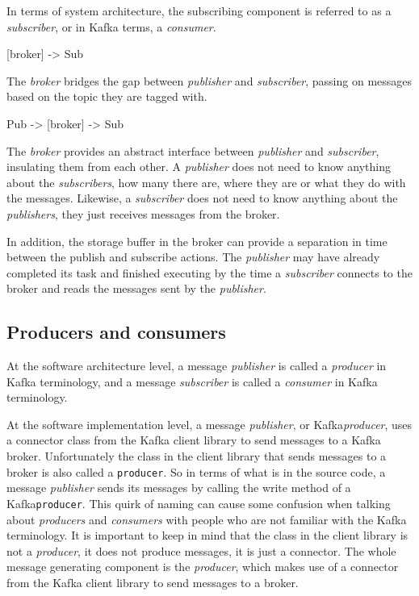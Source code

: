 \documentclass{article}
\newcommand{\kafka} {Kafka\xspace}
\newcommand{\kfbroker} {\textit{broker}\xspace}
\newcommand{\kfconsumer} {\textit{consumer}\xspace}
\newcommand{\kfconsumers} {\textit{consumers}\xspace}
\newcommand{\kfproducer} {\textit{producer}\xspace}
\newcommand{\kfproducers} {\textit{producers}\xspace}
\newcommand{\kfpublisher} {\textit{publisher}\xspace}
\newcommand{\kfpublishers} {\textit{publishers}\xspace}
\newcommand{\kfsubscriber} {\textit{subscriber}\xspace}
\newcommand{\kfsubscribers} {\textit{subscribers}\xspace}
\begin{document}
In terms of system architecture, the subscribing component is referred to as a \kfsubscriber, or in \kafka terms, a \kfconsumer.

   [broker] -> {Sub}

The \kfbroker bridges the gap between \kfpublisher and \kfsubscriber, passing on messages based on the topic they are tagged with.

   {Pub} -> [broker] -> {Sub}

The \kfbroker provides an abstract interface between \kfpublisher and \kfsubscriber, insulating them from each other. A \kfpublisher does not need to know anything about the \kfsubscribers, how many there are, where they are or what they do with the messages. Likewise, a \kfsubscriber does not need to know anything about the \kfpublishers, they just receives messages from the broker. 

In addition, the storage buffer in the broker can provide a separation in time between the publish and subscribe actions. The \kfpublisher may have already completed its task and finished executing by the time a \kfsubscriber connects to the broker and reads the messages sent by the \kfpublisher. 

\subsection{Producers and consumers}
\label{kafka-producer-consumer}

At the software architecture level, a message \kfpublisher is called a \kfproducer in \kafka terminology, and a message \kfsubscriber is called a \kfconsumer in \kafka terminology.

At the software implementation level, a message \kfpublisher, or \kafka \kfproducer, uses a connector class from the \kafka client library to send messages to a \kafka broker.
Unfortunately the class in the client library that sends messages to a broker is also called a \texttt{producer}. So in terms of what is in the source code, a message \kfpublisher sends its messages by calling the write method of a \kafka \texttt{producer}.
This quirk of naming can cause some confusion when talking about \kfproducers and \kfconsumers with people who are not familiar with the \kafka terminology.
It is important to keep in mind that the class in the client library is not a \kfproducer, it does not produce messages, it is just a connector. The whole message generating component is the \kfproducer, which makes use of a connector from the \kafka client library to send messages to a broker.
\end{document}
